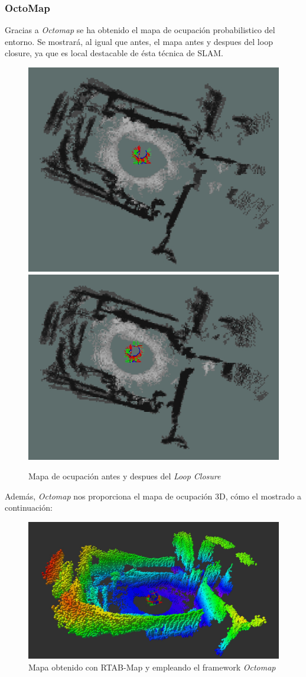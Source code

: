 \newpage
    \subsubsection{OctoMap}
Gracias a \textit{Octomap} se ha obtenido el mapa de ocupación probabilistico del entorno. Se mostrará, al igual que antes, el mapa antes y despues del loop closure, ya que es local
destacable de ésta técnica de SLAM.
\begin{figure}[h!]
    \centering
    \includegraphics[width=.4\textwidth]{images/slam/bag3_occupGrid_noLC}
    \includegraphics[width=.435\textwidth]{images/slam/bag3_occupGrid_LC}
    \caption{Mapa de ocupación antes y despues del \textit{Loop Closure}}
\end{figure}

Además, \textit{Octomap} nos proporciona el mapa de ocupación 3D, cómo el mostrado a continuación:
\begin{figure}[h!]
    \centering
    \includegraphics[width=.9\textwidth]{images/slam/bag3_octomap_LC}
    \caption{Mapa obtenido con RTAB-Map y empleando el framework \textit{Octomap}}
\end{figure}

